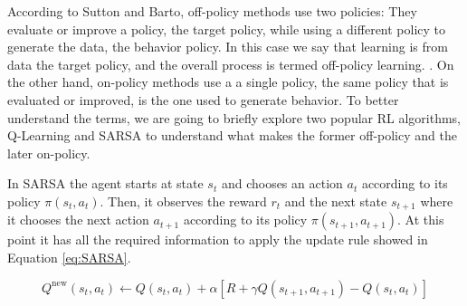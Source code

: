 According to Sutton and Barto, off-policy methods use two policies: They evaluate or improve a policy, the target policy, while using a different policy to generate the data, the behavior policy. In this case we say that learning is from data  the target policy, and the overall process is termed off-policy learning. \cite{Sutton:1998}. On the other hand, on-policy methods use a a single policy, the same policy that is evaluated or improved, is the one used to generate behavior. 
To better understand the terms, we are going to briefly explore two popular RL algorithms, Q-Learning \cite{Watkins:1989} and SARSA \cite{Rummery+Niranjan:1994} to understand what makes the former off-policy and the later on-policy.







In SARSA the agent starts at state $s_t$ and chooses an action $a_t$ according to its policy $\pi(s_t, a_t)$. Then, it observes the reward $r_t$ and the next state $s_{t+1}$ where it chooses the next action $a_{t+1}$ according to its policy $\pi(s_{t+1}, a_{t+1})$. At this point it has all the required information to apply the update rule showed in Equation \eqref{eq:SARSA}.

\begin{equation}
Q^{\text{new}}(s_t, a_t)  \leftarrow Q(s_t, a_t) + \alpha \left[R+ \gamma  Q(s_{t+1}, a_{t+1}) - Q(s_t, a_t)\right]
\label{eq:SARSA}
\end{equation}


